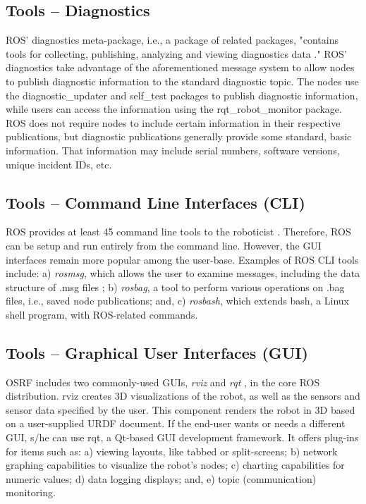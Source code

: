 \documentclass[9pt,twocolumn,twoside]{../../styles/osajnl}
\begin{document}
\subsection{Tools -- Diagnostics}
ROS' diagnostics meta-package, i.e., a package of related packages,  "contains tools for collecting, publishing, analyzing and viewing diagnostics data \cite{www-ros-diagnostics}."  ROS' diagnostics take advantage of the aforementioned message system to allow nodes to publish diagnostic information to the standard diagnostic topic.  The nodes use the diagnostic\_updater and self\_test packages to publish diagnostic information, while users can access the information using the rqt\_robot\_monitor package.  ROS does not require nodes to include certain information in their respective publications, but diagnostic publications generally provide some standard, basic information.  That information may include serial numbers, software versions, unique incident IDs, etc. 

\subsection{Tools -- Command Line Interfaces (CLI)}

ROS provides at least 45 command line tools to the roboticist \cite{www-ros-cli}.  Therefore, ROS can be setup and run entirely from the command line.  However, the GUI interfaces remain more popular among the user-base.  Examples of ROS CLI tools include: a) \textit{rosmsg}, which allows the user to examine messages, including the data structure of .msg files \cite{www-ros-messages}; b) \textit{rosbag}, a tool to perform various operations on .bag files, i.e., saved node publications; and, c) \textit{rosbash}, which extends bash, a Linux shell program, with ROS-related commands. 

\subsection{Tools -- Graphical User Interfaces (GUI)}
OSRF includes two commonly-used GUIs, \textit{rviz} and \textit{rqt} \cite{www-ros-core-components}, in the core ROS distribution.  rviz creates 3D visualizations of the robot, as well as the sensors and sensor data specified by the user.  This component renders the robot in 3D based on a user-supplied URDF document.  If the end-user wants or needs a different GUI, s/he can use rqt, a Qt-based GUI development framework.  It offers plug-ins for items such as: a) viewing layouts, like tabbed or split-screens; b) network graphing capabilities to visualize the robot's nodes; c) charting capabilities for numeric values; d) data logging displays; and, e) topic (communication) monitoring.   
\end{document}
